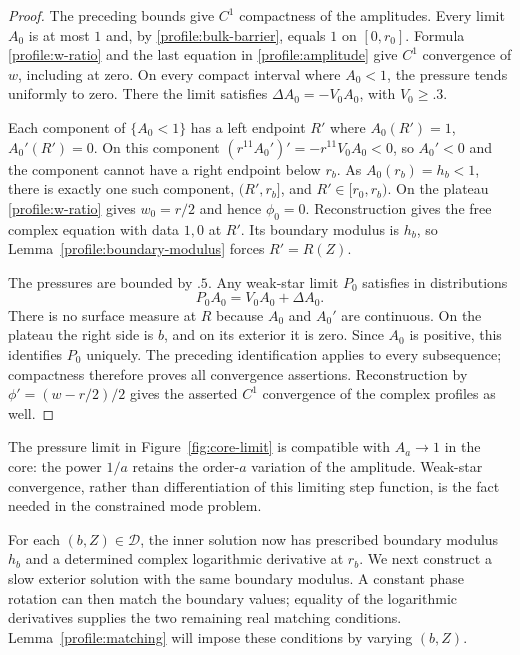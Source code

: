 \begin{proof}
The preceding bounds give $C^1$ compactness of the amplitudes.  Every
limit $A_0$ is at most $1$ and, by \eqref{profile:bulk-barrier}, equals
$1$ on $[0,r_0]$.  Formula \eqref{profile:w-ratio} and the last equation
in \eqref{profile:amplitude} give $C^1$ convergence of $w$, including at
zero.  On every compact interval where $A_0<1$, the pressure tends
uniformly to zero.  There the limit satisfies $\Delta A_0=-V_0A_0$,
with $V_0\ge.3$.

Each component of $\{A_0<1\}$ has a left endpoint $R'$ where
$A_0(R')=1$, $A_0'(R')=0$.  On this component
$(r^{11}A_0')'=-r^{11}V_0A_0<0$, so $A_0'<0$ and the component cannot
have a right endpoint below $r_b$.  As $A_0(r_b)=h_b<1$, there is exactly
one such component, $(R',r_b]$, and $R'\in[r_0,r_b)$.  On the plateau
\eqref{profile:w-ratio} gives $w_0=r/2$ and hence $\phi_0=0$.
Reconstruction gives the free complex equation with data $1,0$ at $R'$.
Its boundary modulus is $h_b$, so
Lemma~\ref{profile:boundary-modulus} forces $R'=R(Z)$.

The pressures are bounded by $.5$.  Any weak-star limit $P_0$ satisfies
in distributions
\[
 P_0A_0=V_0A_0+\Delta A_0.
\]
There is no surface measure at $R$ because $A_0$ and $A_0'$ are
continuous.  On the plateau the right side is $b$, and on its exterior
it is zero.  Since $A_0$ is positive, this identifies $P_0$ uniquely.
The preceding identification applies to every subsequence; compactness
therefore proves all convergence assertions.  Reconstruction by
$\phi'=(w-r/2)/2$ gives the asserted $C^1$ convergence of the complex
profiles as well.
\end{proof}



The pressure limit in Figure~\ref{fig:core-limit} is compatible with
$A_a\to1$ in the core: the power $1/a$ retains the order-$a$ variation of
the amplitude.  Weak-star convergence, rather than differentiation of
this limiting step function, is the fact needed in the constrained mode
problem.

For each $(b,Z)\in\mathcal D$, the inner solution now has prescribed
boundary modulus $h_b$ and a determined complex logarithmic derivative
at $r_b$. We next construct a slow exterior solution with the same
boundary modulus. A constant phase rotation can then match the boundary
values; equality of the logarithmic derivatives supplies the two
remaining real matching conditions. Lemma~\ref{profile:matching} will
impose these conditions by varying $(b,Z)$.

